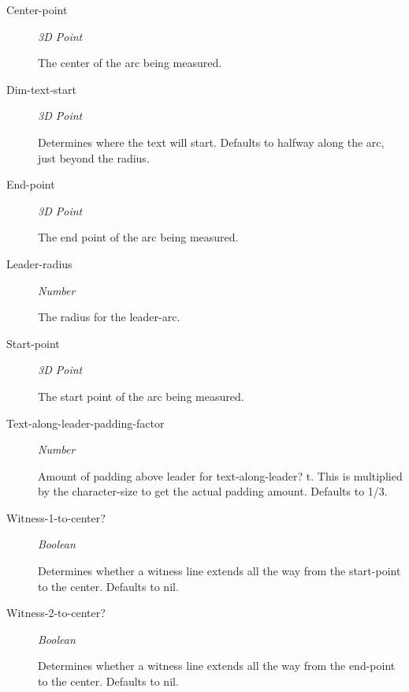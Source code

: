 \documentclass [11pt]{book}
\begin{document}
\begin{itemize}
\begin{description}
\item [Center-point]
\emph{3D Point}

 The center of the arc being measured.




\item [Dim-text-start]
\emph{3D Point}

 Determines where the text will start. Defaults to halfway along the arc, just beyond the radius.




\item [End-point]
\emph{3D Point}

 The end point of the arc being measured.




\item [Leader-radius]
\emph{Number}

 The radius for the leader-arc.




\item [Start-point]
\emph{3D Point}

 The start point  of the arc being measured.




\item [Text-along-leader-padding-factor]
\emph{Number}

 Amount of padding above leader for text-along-leader? t. This is multiplied by the
character-size to get the actual padding amount. Defaults to 1/3.




\item [Witness-1-to-center?]
\emph{Boolean}

 Determines whether a witness line extends all the way from the start-point to the center.
Defaults to nil.




\item [Witness-2-to-center?]
\emph{Boolean}

 Determines whether a witness line extends all the way from the end-point to the center.
Defaults to nil.





\end{description}
\end{itemize}
\end{document}
